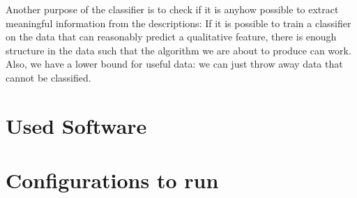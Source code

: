 Another purpose of the classifier is to check if it is anyhow possible to extract meaningful information from the descriptions: If it is possible to train a classifier on the data that can reasonably predict a qualitative feature, there is enough structure in the data such that the algorithm we are about to produce can work. Also, we have a lower bound for useful data: we can just throw away data that cannot be classified.


\section{Used Software}



\section{Configurations to run \mainalgos}
\label{ap:yamls_for_origalgos}

